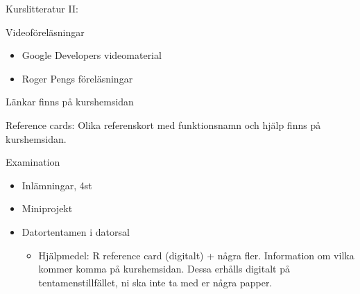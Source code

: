 \documentclass[
  10pt,
  ignorenonframetext,
]{beamer}
\providecommand{\tightlist}{%
  \setlength{\itemsep}{0pt}\setlength{\parskip}{0pt}}
\begin{document}
\begin{frame}{Kurslitteratur II:}
\protect\hypertarget{kurslitteratur-ii}{}
\begin{block}{Videoföreläsningar}
\protect\hypertarget{videofuxf6reluxe4sningar}{}
\begin{itemize}
\tightlist
\item
  Google Developers videomaterial
\item
  Roger Pengs föreläsningar
\end{itemize}

Länkar finns på kurshemsidan
\end{block}

\begin{block}{Reference cards:}
\protect\hypertarget{reference-cards}{}
Olika referenskort med funktionsnamn och hjälp finns på kurshemsidan.
\end{block}
\end{frame}

\begin{frame}{Examination}
\protect\hypertarget{examination}{}
\begin{itemize}
\tightlist
\item
  Inlämningar, 4st
\item
  Miniprojekt
\item
  Datortentamen i datorsal

  \begin{itemize}
  \tightlist
  \item
    Hjälpmedel: R reference card (digitalt) + några fler. Information om
    vilka kommer komma på kurshemsidan. Dessa erhålls digitalt på
    tentamenstillfället, ni ska inte ta med er några papper.
  \end{itemize}
\end{itemize}
\end{frame}
\end{document}
